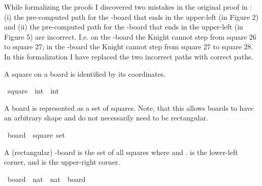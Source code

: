 \begin{isabellebody}
\begin{isamarkuptext}
While formalizing the proofs I discovered two mistakes in the original proof in 
\cite{cull_decurtins_1987}: (i) the pre-computed path for the -board that ends in 
the upper-left (in Figure 2) and (ii) the pre-computed path for the -board that ends in 
the upper-left (in Figure 5) are incorrect. I.e. on the -board the Knight cannot step 
from square 26 to square 27; in the -board the Knight cannot step from square 27 to 
square 28. In this formalization I have replaced the two incorrect paths with correct paths.%
\end{isamarkuptext}\isamarkuptrue%
%
\begin{isamarkuptext}%
A square on a board is identified by its coordinates.%
\end{isamarkuptext}\isamarkuptrue%
\isamarkupfalse%
\ square\ {\isacharequal}{\kern0pt}\ {\isachardoublequoteopen}int\ {\isasymtimes}\ int{\isachardoublequoteclose}%
\begin{isamarkuptext}%
A board is represented as a set of squares. Note, that this allows boards to have an 
arbitrary shape and do not necessarily need to be rectangular.%
\end{isamarkuptext}\isamarkuptrue%
\isamarkupfalse%
\ board\ {\isacharequal}{\kern0pt}\ {\isachardoublequoteopen}square\ set{\isachardoublequoteclose}%
\begin{isamarkuptext}%
A (rectangular) -board is the set of all squares  where  
and .  is the lower-left corner, and  is the upper-right corner.%
\end{isamarkuptext}\isamarkuptrue%
\isamarkupfalse%
\ board\ {\isacharcolon}{\kern0pt}{\isacharcolon}{\kern0pt}\ {\isachardoublequoteopen}nat\ {\isasymRightarrow}\ nat\ {\isasymRightarrow}\ board{\isachardoublequoteclose}\ \isanewline

\end{isabellebody}
